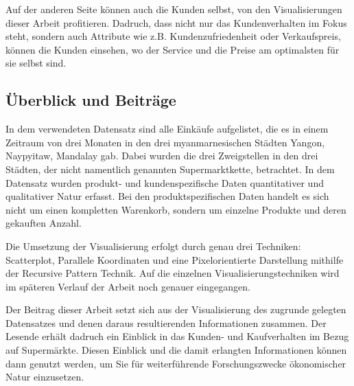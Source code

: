 \documentclass[usegeometry=true]{scrartcl}
\begin{document}
\noindent Auf der anderen Seite können auch die Kunden selbst, von den Visualisierungen dieser Arbeit profitieren. Dadruch, dass nicht nur das Kundenverhalten im Fokus steht,
sondern auch Attribute wie z.B. Kundenzufriedenheit oder Verkaufspreis, können die Kunden einsehen, wo der Service und die Preise am optimalsten für sie selbst sind.

\subsection{Überblick und Beiträge}
In dem verwendeten Datensatz sind alle Einkäufe aufgelistet, die es in einem Zeitraum von drei Monaten in den drei myanmarnesischen Städten Yangon, Naypyitaw, Mandalay gab.
Dabei wurden die drei Zweigstellen in den drei Städten, der nicht namentlich genannten Supermarktkette, betrachtet. In dem Datensatz wurden produkt- und kundenspezifische
Daten quantitativer und qualitativer Natur erfasst. Bei den produktspezifischen Daten handelt es sich nicht um einen kompletten Warenkorb, sondern
um einzelne Produkte und deren gekauften Anzahl.

\noindent Die Umsetzung der Visualisierung erfolgt durch genau drei Techniken: Scatterplot, Parallele Koordinaten und eine Pixelorientierte Darstellung mithilfe der Recursive Pattern
Technik. Auf die einzelnen Visualisierungstechniken wird im späteren Verlauf der Arbeit noch genauer eingegangen.

\noindent Der Beitrag dieser Arbeit setzt sich aus der Visualisierung des zugrunde gelegten Datensatzes und denen daraus resultierenden Informationen zusammen. Der Lesende erhält
dadruch ein Einblick in das Kunden- und Kaufverhalten im Bezug auf Supermärkte. Diesen Einblick und die damit erlangten Informationen können dann genutzt werden, um Sie für
weiterführende Forschungszwecke ökonomischer Natur einzusetzen.
\end{document}
